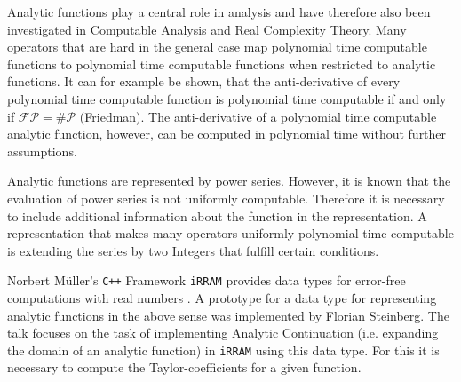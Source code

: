 \documentclass{article}
\newcommand{\fp}{\ensuremath{\mathcal{FP}}}
\newcommand{\sharpp}{\ensuremath{\# \mathcal{P}}}
\newcommand{\cc}{\texttt{C++}\xspace}
\newcommand{\irram}{\texttt{iRRAM}\xspace}
\begin{document}
	Analytic functions play a central role in analysis and have therefore also been investigated in Computable Analysis and Real Complexity Theory.
	Many operators that are hard in the general case map polynomial time computable functions to polynomial time computable functions when restricted to analytic functions.
	It can for example be shown, that the anti-derivative of every polynomial time computable function is polynomial time computable if and only if $\fp = \sharpp$ (Friedman).
	The anti-derivative of a polynomial time computable analytic function, however, can be computed in polynomial time without further assumptions.

	Analytic functions are represented by power series.
	However, it is known that the evaluation of power series is not uniformly computable.
	Therefore it is necessary to include additional information about the function in the representation.
	A representation that makes many operators uniformly polynomial time computable is extending the series by two Integers that fulfill certain conditions.

	Norbert Müller's \cc Framework \irram provides data types for error-free computations with real numbers \cite{Mueller00}.
	A prototype for a data type for representing analytic functions in the above sense was implemented by Florian Steinberg.
	The talk focuses on the task of implementing Analytic Continuation (i.e. expanding the domain of an analytic function) in \irram using this data type.
	For this it is necessary to compute the Taylor-coefficients for a given function.
\end{document}
